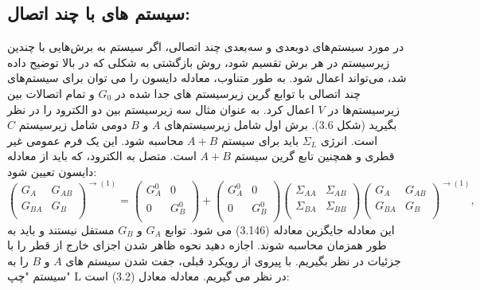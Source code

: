 \subsection{سیستم های با چند اتصال:}
در مورد سیستم‌های دوبعدی و سه‌بعدی چند اتصالی، اگر سیستم به برش‌هایی با چندین زیرسیستم در هر برش تقسیم شود، روش بازگشتی به شکلی که در بالا توضیح داده شد، می‌تواند اعمال شود. به طور متناوب، معادله دایسون را می توان برای سیستم‌های چند اتصالی با توابع گرین زیرسیستم های جدا شده در $G_0$ و تمام اتصالات بین زیرسیستم‌ها در $V$ اعمال کرد.
به عنوان مثال سه زیرسیستم بین دو الکترود را در نظر بگیرید (شکل 3.6). برش اول شامل زیرسیستم‌های $A$ و $B$ دومی شامل زیرسیستم $C$ است. انرژی $\Sigma_{L}$ باید برای سیستم $A + B$ محاسبه شود. این یک فرم عمومی غیر قطری و همچنین تابع گرین سیستم $A + B$ است. متصل به الکترود، که باید از معادله دایسون تعیین شود:
\begin{equation}
    {{\left( \begin{matrix}
           {{G}_{A}} & {{G}_{AB}}  \\
           {{G}_{BA}} & {{G}_{B}}  \\
        \end{matrix} \right)}^{\to (1)}}=\left( \begin{matrix}
           G_{A}^{0} & 0  \\
           0 & G_{B}^{0}  \\
        \end{matrix} \right)+\left( \begin{matrix}
           G_{A}^{0} & 0  \\
           0 & G_{B}^{0}  \\
        \end{matrix} \right)\left( \begin{matrix}
           {{\Sigma }_{AA}} & {{\Sigma }_{AB}}  \\
           {{\Sigma }_{BA}} & {{\Sigma }_{BB}}  \\
        \end{matrix} \right){{\left( \begin{matrix}
           {{G}_{A}} & {{G}_{AB}}  \\
           {{G}_{BA}} & {{G}_{B}}  \\
        \end{matrix} \right)}^{\to (1)}},
\end{equation}
این معادله جایگزین معادله (3.146) می شود. توابع $G_A$ و $G_B$ مستقل نیستند و باید به طور همزمان محاسبه شوند.
اجازه دهید نحوه ظاهر شدن اجزای خارج از قطر را با جزئیات در نظر بگیریم. با پیروی از رویکرد قبلی، جفت شدن سیستم های $A$ و $B$ را به سیستم "چپ" L در نظر می گیریم. معادله معادل (3.2) است:
